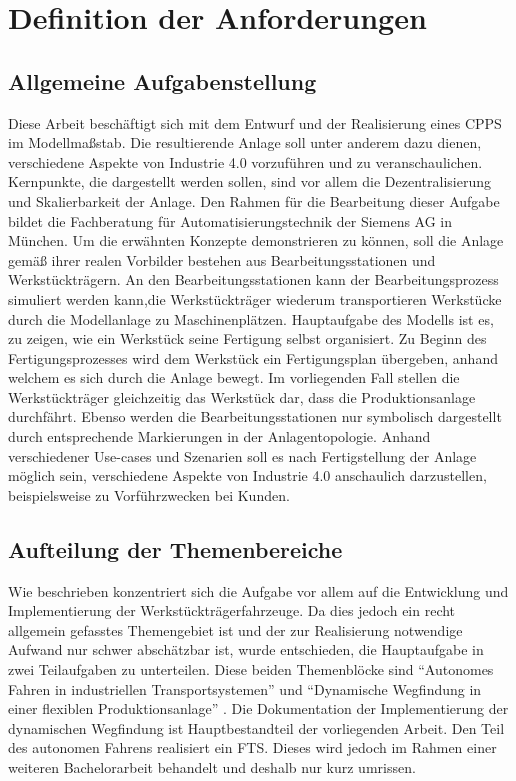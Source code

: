 \chapter{Definition der Anforderungen}
\label{Anforderungen}
\section{Allgemeine Aufgabenstellung}
	\label{Alg._Aufgabenstellung}
	Diese Arbeit beschäftigt sich mit dem Entwurf und der Realisierung eines \ac{CPPS} im Modellmaßstab. Die resultierende Anlage soll unter anderem dazu dienen, verschiedene Aspekte von Industrie 4.0 vorzuführen und zu veranschaulichen. Kernpunkte, die dargestellt werden sollen, sind vor allem die Dezentralisierung und Skalierbarkeit der Anlage. Den Rahmen für die Bearbeitung dieser Aufgabe bildet die Fachberatung für Automatisierungstechnik der Siemens AG in München. Um die erwähnten Konzepte demonstrieren zu können, soll die Anlage gemäß ihrer realen Vorbilder bestehen aus Bearbeitungsstationen und Werkstückträgern. An den Bearbeitungsstationen kann der Bearbeitungsprozess simuliert werden kann,die Werkstückträger wiederum transportieren Werkstücke durch die Modellanlage zu Maschinenplätzen. Hauptaufgabe des Modells ist es, zu zeigen, wie ein Werkstück seine Fertigung selbst organisiert. Zu Beginn des Fertigungsprozesses wird dem Werkstück ein Fertigungsplan übergeben, anhand welchem es sich durch die Anlage bewegt. Im vorliegenden Fall stellen die Werkstückträger gleichzeitig das Werkstück dar, dass die Produktionsanlage durchfährt. Ebenso werden die Bearbeitungsstationen nur symbolisch dargestellt durch entsprechende Markierungen in der Anlagentopologie. Anhand verschiedener Use-cases und Szenarien soll es nach Fertigstellung der Anlage möglich sein, verschiedene Aspekte von Industrie 4.0 anschaulich darzustellen, beispielsweise zu Vorführzwecken bei Kunden.

\section{Aufteilung der Themenbereiche}

	Wie beschrieben konzentriert sich die Aufgabe vor allem auf die Entwicklung und Implementierung der Werkstückträgerfahrzeuge. Da dies jedoch ein recht allgemein gefasstes Themengebiet ist und der zur Realisierung notwendige Aufwand nur schwer abschätzbar ist, wurde entschieden, die Hauptaufgabe in zwei Teilaufgaben zu unterteilen. Diese beiden Themenblöcke sind "`Autonomes Fahren in industriellen Transportsystemen"' und "`Dynamische Wegfindung in einer flexiblen Produktionsanlage"' \cite{I40Modell}. Die Dokumentation der Implementierung der dynamischen Wegfindung ist Hauptbestandteil der vorliegenden Arbeit. Den Teil des autonomen Fahrens realisiert ein \ac{FTS}. Dieses wird jedoch im Rahmen einer weiteren Bachelorarbeit behandelt \cite{Meier16} und deshalb nur kurz umrissen.

